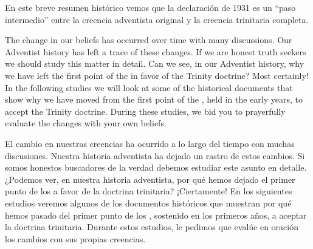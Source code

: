 En este breve resumen histórico vemos que la declaración de 1931 es un “paso intermedio” entre la creencia adventista original y la creencia trinitaria completa.


The change in our beliefs has occurred over time with many discussions. Our Adventist history has left a trace of these changes. If we are honest truth seekers we should study this matter in detail. Can we see, in our Adventist history, why we have left the first point of the  in favor of the Trinity doctrine? Most certainly! In the following studies we will look at some of the historical documents that show why we have moved from the first point of the , held in the early years, to accept the Trinity doctrine. During these studies, we bid you to prayerfully evaluate the changes with your own beliefs.


El cambio en nuestras creencias ha ocurrido a lo largo del tiempo con muchas discusiones. Nuestra historia adventista ha dejado un rastro de estos cambios. Si somos honestos buscadores de la verdad debemos estudiar este asunto en detalle. ¿Podemos ver, en nuestra historia adventista, por qué hemos dejado el primer punto de los  a favor de la doctrina trinitaria? ¡Ciertamente! En los siguientes estudios veremos algunos de los documentos históricos que muestran por qué hemos pasado del primer punto de los , sostenido en los primeros años, a aceptar la doctrina trinitaria. Durante estos estudios, le pedimos que evalúe en oración los cambios con sus propias creencias.





% 
